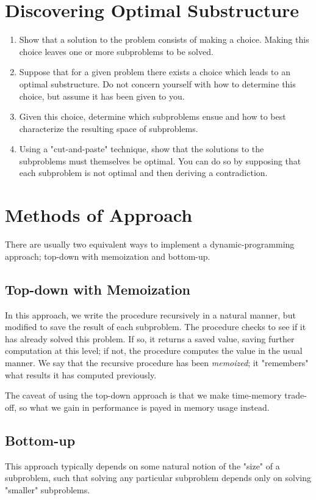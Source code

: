 \section{Discovering Optimal Substructure}
\begin{enumerate}
	\item Show that a solution to the problem consists of making a choice.
Making this choice leaves one or more subproblems to be solved.
	\item Suppose that for a given problem there exists a choice which leads
to an optimal substructure. Do not concern yourself with how to determine this
choice, but assume it has been given to you.
	\item Given this choice, determine which subproblems ensue and how to best
characterize the resulting space of subproblems.
	\item Using a "cut-and-paste" technique, show that the solutions to the
subproblems must themselves be optimal. You can do so by supposing that each
subproblem is not optimal and then deriving a contradiction.
\end{enumerate}

\section{Methods of Approach}
There are usually two equivalent ways to implement a dynamic-programming
approach; top-down with memoization and bottom-up.

\subsection{Top-down with Memoization}
In this approach, we write the procedure recursively in a natural manner, but
modified to save the result of each subproblem. The procedure checks to see
if it has already solved this problem. If so, it returns a saved value, saving
further computation at this level; if not, the procedure computes the value in
the usual manner. We say that the recursive procedure has been
\textit{memoized}; it "remembers" what results it has computed previously.

The caveat of using the top-down approach is that we make time-memory
trade-off, so what we gain in performance is payed in memory usage instead.

\subsection{Bottom-up}
This approach typically depends on some natural notion of the "size" of a
subproblem, such that solving any particular subproblem depends only on
solving "smaller" subproblems.


